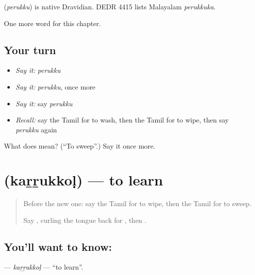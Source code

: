 \begin{cousinweb}
\textbf{} (\emph{perukku}) is native Dravidian. DEDR 4415 lists Malayalam \emph{perukkuka}.
\end{cousinweb}

\begin{grammarlens}[title={What you've built}]
One more word for this chapter.
\end{grammarlens}

\subsection*{Your turn}
\begin{itemize}
\raggedright
  \item \emph{Say it:} \emph{perukku}
  \item \emph{Say it:} \emph{perukku}, once more
  \item \emph{Say it:} say \emph{perukku}
  \item \emph{Recall:} say the Tamil for to wash, then the Tamil for to wipe, then say \emph{perukku} again
\end{itemize}

\begin{tcolorbox}[breakable,colback=teal!4,colframe=teal!35!black,title={Before you move on}]
What does  mean? (\textquotedblleft{}To sweep\textquotedblright{}.) Say it once more.
\end{tcolorbox}
\section[\texorpdfstring{\ta{கற்றுக்கொள்} (kaṟṟukkoḷ)}{கற்றுக்கொள் (kaṟṟukkoḷ)}]{ (kaṟṟukkoḷ) — to learn}

\label{lesson:TA-C156-karrukkol}



\begin{quote}
Before the new one: say the Tamil for to wipe, then the Tamil for to sweep.

Say \textbf{}, curling the tongue back for \textbf{}, then \textbf{}.
\end{quote}

\subsection*{You'll want to know: }
\textbf{} — \emph{kaṟṟukkoḷ} — \textquotedblleft{}to learn\textquotedblright{}.


